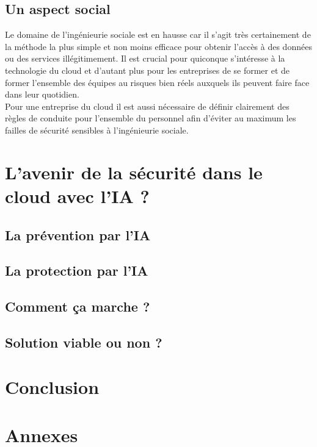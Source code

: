 \documentclass[a4paper, 12pt]{article}
\begin{document}
    \subsection{Un aspect social}
      Le domaine de l'ingénieurie sociale est en hausse car il s'agit très 
      certainement de la méthode la plus simple et non moins efficace pour 
      obtenir l'accès à des données ou des services illégitimement. Il est 
      crucial pour quiconque s'intéresse à la technologie du cloud et d'autant
      plus pour les entreprises de se former et de former l'ensemble des 
      équipes au risques bien réels auxquels ils peuvent faire face dans leur 
      quotidien. \\
      
      Pour une entreprise du cloud il est aussi nécessaire de définir 
      clairement des règles de conduite pour l'ensemble du personnel afin
      d'éviter au maximum les failles de sécurité sensibles à l'ingénieurie
      sociale.

  \section{L'avenir de la sécurité dans le cloud avec l'IA ?}
    \subsection{La prévention par l'IA}
    \subsection{La protection par l'IA}
    \subsection{Comment ça marche ?}
    \subsection{Solution viable ou non ?}

  \section{Conclusion}

  \section{Annexes}
\end{document}
